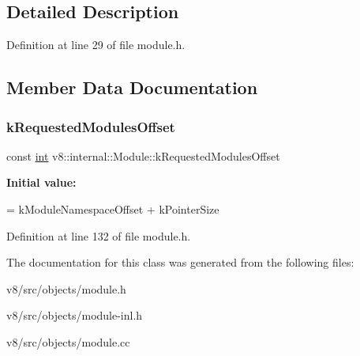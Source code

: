 \subsection{Detailed Description}


Definition at line 29 of file module.\+h.



\subsection{Member Data Documentation}
\mbox{\label{classv8_1_1internal_1_1Module_a2b866e6b7f692fde4543a3fe5ab97d93}} 
\subsubsection{\texorpdfstring{k\+Requested\+Modules\+Offset}{kRequestedModulesOffset}}
{\footnotesize\ttfamily const \mbox{\hyperlink{classint}{int}} v8\+::internal\+::\+Module\+::k\+Requested\+Modules\+Offset\hspace{0.3cm}{\ttfamily [static]}}

{\bfseries Initial value\+:}
\begin{DoxyCode}
=
      kModuleNamespaceOffset + kPointerSize
\end{DoxyCode}


Definition at line 132 of file module.\+h.



The documentation for this class was generated from the following files\+:\begin{DoxyCompactItemize}
\item 
v8/src/objects/module.\+h\item 
v8/src/objects/module-\/inl.\+h\item 
v8/src/objects/module.\+cc\end{DoxyCompactItemize}

